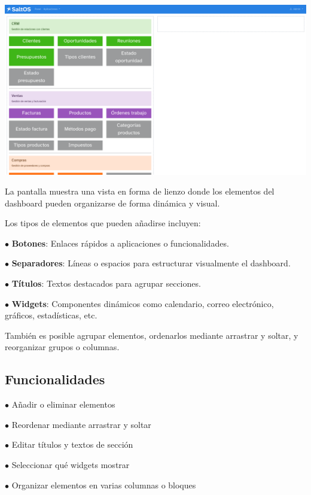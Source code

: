 \documentclass[a4paper]{article}
\begin{document}
\begin{center}\includegraphics[width=1\textwidth]{../ujest/snaps/test-screenshots-js-screenshots-dashboard-dashboard-widgets-es-es-1-snap.png}\end{center}

La pantalla muestra una vista en forma de lienzo donde los elementos del dashboard pueden organizarse de forma dinámica y visual.

Los tipos de elementos que pueden añadirse incluyen:

\begin{compactitem}
\item[\color{myblue}$\bullet$] \textbf{Botones}: Enlaces rápidos a aplicaciones o funcionalidades.
\item[\color{myblue}$\bullet$] \textbf{Separadores}: Líneas o espacios para estructurar visualmente el dashboard.
\item[\color{myblue}$\bullet$] \textbf{Títulos}: Textos destacados para agrupar secciones.
\item[\color{myblue}$\bullet$] \textbf{Widgets}: Componentes dinámicos como calendario, correo electrónico, gráficos, estadísticas, etc.
\end{compactitem}

También es posible agrupar elementos, ordenarlos mediante arrastrar y soltar, y reorganizar grupos o columnas.

\hypertarget{toc88}{}
\subsection{Funcionalidades}

\begin{compactitem}
\item[\color{myblue}$\bullet$] Añadir o eliminar elementos
\item[\color{myblue}$\bullet$] Reordenar mediante arrastrar y soltar
\item[\color{myblue}$\bullet$] Editar títulos y textos de sección
\item[\color{myblue}$\bullet$] Seleccionar qué widgets mostrar
\item[\color{myblue}$\bullet$] Organizar elementos en varias columnas o bloques
\end{compactitem}
\end{document}
